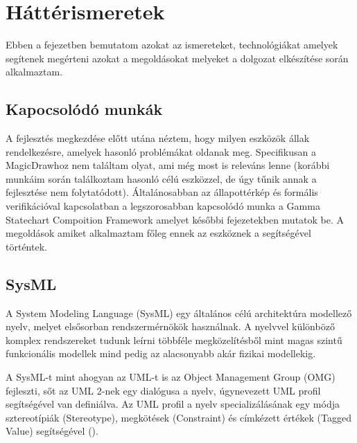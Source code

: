 \chapter{Háttérismeretek}

Ebben a fejezetben bemutatom azokat az ismereteket, technológiákat amelyek segítenek megérteni azokat a megoldásokat melyeket a dolgozat elkészítése során alkalmaztam.

\section{Kapocsolódó munkák}
A fejlesztés megkezdése előtt utána néztem, hogy milyen eszközök állak rendelkezésre, amelyek hasonló problémákat oldanak meg. Specifikusan a MagicDrawhoz nem találtam olyat, ami még most is releváns lenne (korábbi munkáim során találkoztam hasonló célú eszközzel, de úgy tűnik annak a fejlesztése nem folytatódott). Általánosabban az állapottérkép és formális verifikációval kapcsolatban a legszorosabban kapcsolódó munka a Gamma Statechart Compoition Framework amelyet későbbi fejezetekben mutatok be. A megoldások amiket alkalmaztam főleg ennek az eszköznek a segítségével történtek.

\section{SysML \cite{SysML}}

A System Modeling Language (SysML) egy általános célú architektúra modellező nyelv, melyet elsősorban rendszermérnökök használnak. A nyelvvel különböző komplex rendszereket tudunk leírni többféle megközelítésből mint magas szintű funkcionális modellek mind pedig az alacsonyabb akár fizikai modellekig.

A SysML-t mint ahogyan az UML-t is az Object Management Group (OMG) fejleszti, sőt az UML 2-nek egy dialógusa a nyelv, úgynevezett UML profil segítségével van definiálva. Az UML profil a nyelv specializálásának egy módja sztereotípiák (Stereotype), megkötések (Constraint) és címkézett értékek (Tagged Value) segítségével ().

